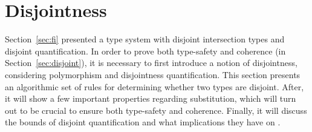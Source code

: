 \section{Disjointness} \label{sec:alg-dis}
Section~\ref{sec:fi} presented a type system with disjoint
intersection types and disjoint quantification. In order to prove 
both type-safety and coherence (in Section~\ref{sec:disjoint}), it is necessary to first introduce a
notion of disjointness, considering polymorphism and disjointness quantification.
This section presents an algorithmic set of rules for determining whether two types are disjoint. 
After, it will show a few important properties regarding substitution, which will turn out
to be crucial to ensure both type-safety and coherence.
Finally, it will discuss the bounds of disjoint quantification and what implications
they have on \name. %


